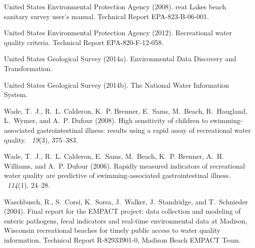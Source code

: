 \documentclass[authoryear,review, 12pt]{elsarticle}
\begin{document}
\begin{thebibliography}{}
{United States Environmental Protection Agency} (2008).
reat {L}akes beach sanitary survey user's manual.
\newblock Technical Report EPA-823-B-06-001.

{United States Environmental Protection Agency} (2012).
\newblock Recreational water quality criteria.
\newblock Technical Report EPA-820-F-12-058.

{United States Geological Survey} (2014a).
\newblock Environmental {D}ata {D}iscovery and {T}ransformation.

{United States Geological Survey} (2014b).
\newblock The {N}ational {W}ater {I}nformation {S}ystem.

Wade, T.~J., R.~L. Calderon, K.~P. Brenner, E.~Sams, M.~Beach, R.~Haugland,
  L.~Wymer, and A.~P. Dufour (2008).
\newblock High sensitivity of children to swimming-associated gastrointestinal
  illness: results using a rapid assay of recreational water quality.
~{\em 19\/}(3), 375--383.

Wade, T.~J., R.~L. Calderon, E.~Sams, M.~Beach, K.~P. Brenner, A.~H. Williams,
  and A.~P. Dufour (2006).
\newblock Rapidly measured indicators of recreational water quality are
  predictive of swimming-associated gastrointestinal illness.
~{\em 114\/}(1), 24--28.

Waschbusch, R., S.~Corsi, K.~Sorsa, J.~Walker, J.~Standridge, and T.~Schnieder
  (2004).
\newblock Final report for the {EMPACT} project: data collection and modeling
  of enteric pathogens, fecal indicators and real-time environmental data at
  {Madison, Wisconsin} recreational beaches for timely public access to water
  quality information.
\newblock Technical Report R-82933901-0, Madison Beach EMPACT Team.


\end{thebibliography}
\end{document}
